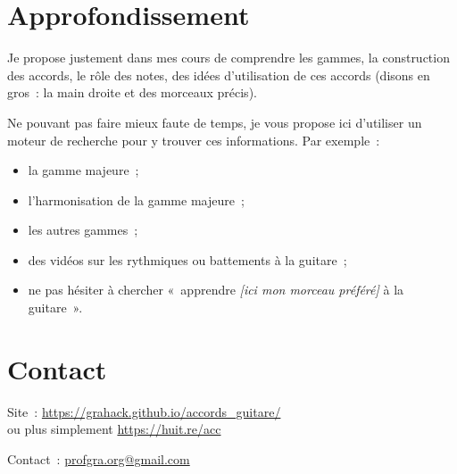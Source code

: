 \documentclass[11pt]{article}
\begin{document}
\section{Approfondissement} \label{approf}

Je propose justement dans mes cours de comprendre les gammes, la construction
des accords, le rôle des notes, des idées d’utilisation de ces accords (disons
en gros~: la main droite et des morceaux précis).

Ne pouvant pas faire mieux faute de temps, je vous propose ici d’utiliser un
moteur de recherche pour y trouver ces informations. Par exemple~:

\begin{itemize}
\item la gamme majeure~;
\item l’harmonisation de la gamme majeure~;
\item les autres gammes~;
\item des vidéos sur les rythmiques ou battements à la guitare~;
\item ne pas hésiter à chercher «~apprendre \textit{[ici mon morceau préféré]}
       à la guitare~».
\end{itemize}

\section{Contact} \label{contact}

\setlength{\parindent}{0pt}

Site~: \url{https://grahack.github.io/accords_guitare/} \\
ou plus simplement \url{https://huit.re/acc}

Contact~: \url{profgra.org@gmail.com}
\end{document}
